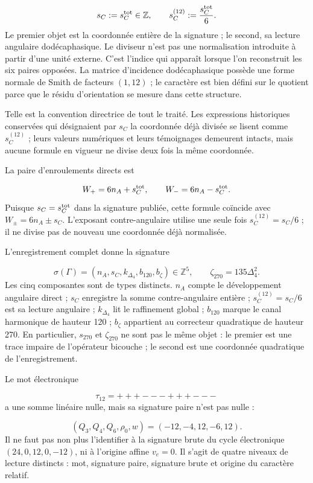\[
s_C:=s_C^{\rm tot}\in\mathbb Z,
\qquad
s_C^{(12)}:=\frac{s_C^{\rm tot}}6.
\]
Le premier objet est la coordonnée entière de la signature ; le second, sa lecture angulaire dodécaphasique. Le diviseur n'est pas une normalisation introduite à partir d'une unité externe. C'est l'indice qui apparaît lorsque l'on reconstruit les six paires opposées. La matrice d'incidence dodécaphasique possède une forme normale de Smith de facteurs \((1,12)\) ; le caractère est bien défini sur le quotient parce que le résidu d'orientation se mesure dans cette structure.

Telle est la convention directrice de tout le traité. Les expressions historiques conservées qui désignaient par \(s_C\) la coordonnée déjà divisée se lisent comme \(s_C^{(12)}\) ; leurs valeurs numériques et leurs témoignages demeurent intacts, mais aucune formule en vigueur ne divise deux fois la même coordonnée.

La paire d'enroulements directs est

\[
W_+=6n_A+s_C^{\rm tot},
\qquad
W_-=6n_A-s_C^{\rm tot}.
\]
Puisque \(s_C=s_C^{\rm tot}\) dans la signature publiée, cette formule coïncide avec \(W_\pm=6n_A\pm s_C\). L'exposant contre-angulaire utilise une seule fois \(s_C^{(12)}=s_C/6\) ; il ne divise pas de nouveau une coordonnée déjà normalisée.

L'enregistrement complet donne la signature

\[
\sigma(\Gamma)=
(n_A,s_C,k_{\Delta_4},b_{120},b_\zeta)\in\mathbb Z^5,
\qquad
\zeta_{270}=135\Delta_4^2.
\]
Les cinq composantes sont de types distincts. \(n_A\) compte le développement angulaire direct ; \(s_C\) enregistre la somme contre-angulaire entière ; \(s_C^{(12)}=s_C/6\) est sa lecture angulaire ; \(k_{\Delta_4}\) lit le raffinement global ; \(b_{120}\) marque le canal harmonique de hauteur 120 ; \(b_\zeta\) appartient au correcteur quadratique de hauteur 270. En particulier, \(s_{270}\) et \(\zeta_{270}\) ne sont pas le même objet : le premier est une trace impaire de l'opérateur bicouche ; le second est une coordonnée quadratique de l'enregistrement.

Le mot électronique

\[
\tau_{12}=+++---+++---
\]
a une somme linéaire nulle, mais sa signature paire n'est pas nulle :

\[
(Q_3,Q_4,Q_6,\rho_0,w)=(-12,-4,12,-6,12).
\]
Il ne faut pas non plus l'identifier à la signature brute du cycle électronique \((24,0,12,0,-12)\), ni à l'origine affine \(v_e=0\). Il s'agit de quatre niveaux de lecture distincts : mot, signature paire, signature brute et origine du caractère relatif.

